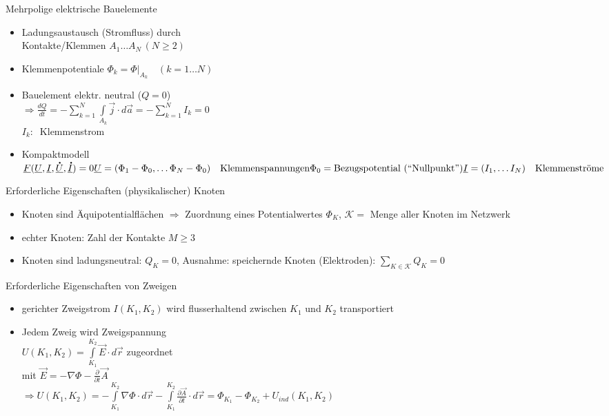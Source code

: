 \documentclass[a6paper]{kartei}
\begin{document}
\begin{karte}{Mehrpolige elektrische Bauelemente}
 \begin{itemize}
  \item Ladungsaustausch (Stromfluss) durch \\ Kontakte/Klemmen $A_{1} \dots A_{N} \, (N \geq 2)$
  \item Klemmenpotentiale $\Phi_{k} = \Phi|_{A_{k}} \quad (k = 1 \dots N)$
  \item Bauelement elektr. neutral ($Q = 0$) \\
  $\Rightarrow \frac{dQ}{dt} = - \sum \limits_{k=1}^{N} \int \limits_{A_{k}} \vec{j} \cdot d\vec{a} = - \sum \limits_{k=1}^{N} I_{k} = 0$ \\
  $I_{k}: \ $ Klemmenstrom
  \item Kompaktmodell $\underline{F}(\underline{U},\underline{I},\underline{\dot{U}},\underline{\dot{I}}) = 0 
   \\\ \\\underline{U} =  (\Phi_{1} - \Phi_{0}, \dots \Phi_{N} - \Phi_{0}) \quad \text{Klemmenspannungen} \nonumber \\
   \Phi_{0} = \text{Bezugspotential (``Nullpunkt'')} \nonumber \\
   \underline{I} = (I_{1}, \dots I_{N}) \quad \text{Klemmenströme} \nonumber$

\end{itemize}
\end{karte}



\begin{karte}{Erforderliche Eigenschaften (physikalischer) Knoten}
\begin{itemize}
\item Knoten sind Äquipotentialflächen $\Rightarrow$ Zuordnung eines Potentialwertes $\Phi_{K}$, $\mathcal{K} = $ Menge aller Knoten im Netzwerk
\item echter Knoten: Zahl der Kontakte $M  \geq 3$
\item Knoten sind ladungsneutral: $Q_{K} = 0$, Ausnahme: speichernde Knoten (Elektroden): $\sum \limits_{K \in \mathcal{K}} Q_{K} = 0$
\end{itemize}
\end{karte}

\begin{karte}{Erforderliche Eigenschaften von Zweigen}
\begin{itemize}
\item gerichter Zweigstrom $I(K_{1},K_{2})$ wird flusserhaltend zwischen $K_{1}$ und $K_{2}$ transportiert
\item Jedem Zweig wird Zweigspannung \\ $U(K_{1},K_{2}) = \int \limits_{K_{1}}^{K_{2}} \vec{E} \cdot d\vec{r}$ zugeordnet \\ 
mit $  \vec{E} = - \nabla \Phi - \frac{\partial}{\partial t} \vec{A}$ \\
$\Rightarrow U(K_{1},K_{2}) = -\int \limits_{K_{1}}^{K_{2}} \nabla \Phi \cdot d\vec{r} - \int \limits_{K_{1}}^{K_{2}} \frac{\partial \vec{A}}{\partial t} \cdot d\vec{r} = \Phi_{K_{1}} - \Phi_{K_{2}} + U_{ind}(K_{1},K_{2}) $
\end{itemize}
\end{karte}
\end{document}

